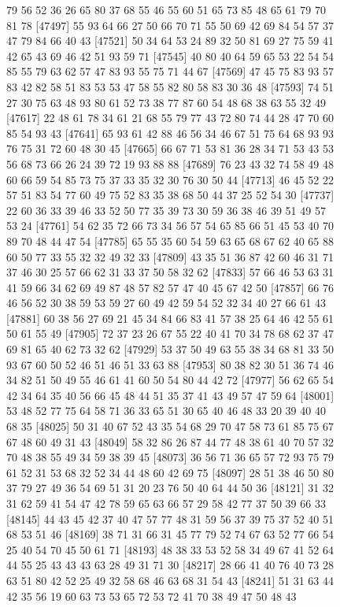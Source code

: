 \documentclass{article}
\begin{document}
\begin{figure}[H]
\begin{Schunk}
\begin{Soutput}
[47473] 79 56 52 36 26 65 80 37 68 55 46 55 60 51 65 73 85 48 65 61 79 70 81 78
[47497] 55 93 64 66 27 50 66 70 71 55 50 69 42 69 84 54 57 37 47 79 84 66 40 43
[47521] 50 34 64 53 24 89 32 50 81 69 27 75 59 41 42 65 43 69 46 42 51 93 59 71
[47545] 40 80 40 64 59 65 53 22 54 54 85 55 79 63 62 57 47 83 93 55 75 71 44 67
[47569] 47 45 75 83 93 57 83 42 82 58 51 83 53 53 47 58 55 82 80 58 83 30 36 48
[47593] 74 51 27 30 75 63 48 93 80 61 52 73 38 77 87 60 54 48 68 38 63 55 32 49
[47617] 22 48 61 78 34 61 21 68 55 79 77 43 72 80 74 44 28 47 70 60 85 54 93 43
[47641] 65 93 61 42 88 46 56 34 46 67 51 75 64 68 93 93 76 75 31 72 60 48 30 45
[47665] 66 67 71 53 81 36 28 34 71 53 43 53 56 68 73 66 26 24 39 72 19 93 88 88
[47689] 76 23 43 32 74 58 49 48 60 66 59 54 85 73 75 37 33 35 32 30 76 30 50 44
[47713] 46 45 52 22 57 51 83 54 77 60 49 75 52 83 35 38 68 50 44 37 25 52 54 30
[47737] 22 60 36 33 39 46 33 52 50 77 35 39 73 30 59 36 38 46 39 51 49 57 53 24
[47761] 54 62 35 72 66 73 34 56 57 54 65 85 66 51 45 53 40 70 89 70 48 44 47 54
[47785] 65 55 35 60 54 59 63 65 68 67 62 40 65 88 60 50 77 33 55 32 32 49 32 33
[47809] 43 35 51 36 87 42 60 46 31 71 37 46 30 25 57 66 62 31 33 37 50 58 32 62
[47833] 57 66 46 53 63 31 41 59 66 34 62 69 49 87 48 57 82 57 47 40 45 67 42 50
[47857] 66 76 46 56 52 30 38 59 53 59 27 60 49 42 59 54 52 32 34 40 27 66 61 43
[47881] 60 38 56 27 69 21 45 34 84 66 83 41 57 38 25 64 46 42 55 61 50 61 55 49
[47905] 72 37 23 26 67 55 22 40 41 70 34 78 68 62 37 47 69 81 65 40 62 73 32 62
[47929] 53 37 50 49 63 55 38 34 68 81 33 50 93 67 60 50 52 46 51 46 51 33 63 88
[47953] 80 38 82 30 51 36 74 46 34 82 51 50 49 55 46 61 41 60 50 54 80 44 42 72
[47977] 56 62 65 54 42 34 64 35 40 56 66 45 48 44 51 35 37 41 43 49 57 47 59 64
[48001] 53 48 52 77 75 64 58 71 36 33 65 51 30 65 40 46 48 33 20 39 40 40 68 35
[48025] 50 31 40 67 52 43 35 54 68 29 70 47 58 73 61 85 75 67 67 48 60 49 31 43
[48049] 58 32 86 26 87 44 77 48 38 61 40 70 57 32 70 48 38 55 49 34 59 38 39 45
[48073] 36 56 71 36 65 57 72 93 75 79 61 52 31 53 68 32 52 34 44 48 60 42 69 75
[48097] 28 51 38 46 50 80 37 79 27 49 36 54 69 51 31 20 23 76 50 40 64 44 50 36
[48121] 31 32 31 62 59 41 54 47 42 78 59 65 63 66 57 29 58 42 77 37 50 39 66 33
[48145] 44 43 45 42 37 40 47 57 77 48 31 59 56 37 39 75 37 52 40 51 68 53 51 46
[48169] 38 71 31 66 31 45 77 79 52 74 67 63 52 77 66 54 25 40 54 70 45 50 61 71
[48193] 48 38 33 53 52 58 34 49 67 41 52 64 44 55 25 43 43 43 63 28 49 31 71 30
[48217] 28 66 41 40 76 40 73 28 63 51 80 42 52 25 49 32 58 68 46 63 68 31 54 43
[48241] 51 31 63 44 42 35 56 19 60 63 73 53 65 72 53 72 41 70 38 49 47 50 48 43

\end{Soutput}
\end{Schunk}
\end{figure}
\end{document}
